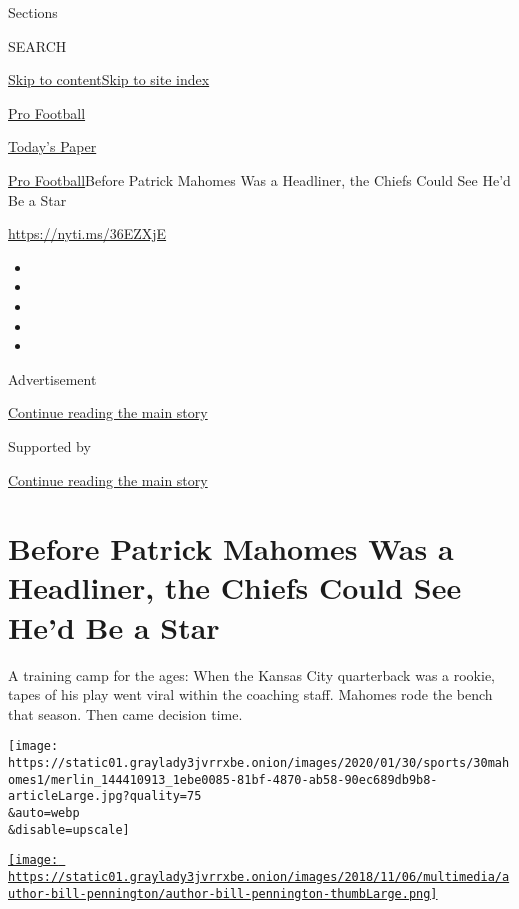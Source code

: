 Sections

SEARCH

\protect\hyperlink{site-content}{Skip to
content}\protect\hyperlink{site-index}{Skip to site index}

\href{https://www.nytimes3xbfgragh.onion/section/sports/football}{Pro
Football}

\href{https://myaccount.nytimes3xbfgragh.onion/auth/login?response_type=cookie\&client_id=vi}{}

\href{https://www.nytimes3xbfgragh.onion/section/todayspaper}{Today's
Paper}

\href{/section/sports/football}{Pro Football}\textbar{}Before Patrick
Mahomes Was a Headliner, the Chiefs Could See He'd Be a Star

\url{https://nyti.ms/36EZXjE}

\begin{itemize}
\item
\item
\item
\item
\item
\end{itemize}

Advertisement

\protect\hyperlink{after-top}{Continue reading the main story}

Supported by

\protect\hyperlink{after-sponsor}{Continue reading the main story}

\hypertarget{before-patrick-mahomes-was-a-headliner-the-chiefs-could-see-hed-be-a-star}{%
\section{Before Patrick Mahomes Was a Headliner, the Chiefs Could See
He'd Be a
Star}\label{before-patrick-mahomes-was-a-headliner-the-chiefs-could-see-hed-be-a-star}}

A training camp for the ages: When the Kansas City quarterback was a
rookie, tapes of his play went viral within the coaching staff. Mahomes
rode the bench that season. Then came decision time.

\texttt{[image: https://static01.graylady3jvrrxbe.onion/images/2020/01/30/sports/30mahomes1/merlin\_144410913\_1ebe0085-81bf-4870-ab58-90ec689db9b8-articleLarge.jpg?quality=75\\\&auto=webp\\\&disable=upscale]}

\href{https://www.nytimes3xbfgragh.onion/by/bill-pennington}{\texttt{[image: https://static01.graylady3jvrrxbe.onion/images/2018/11/06/multimedia/author-bill-pennington/author-bill-pennington-thumbLarge.png]}}

